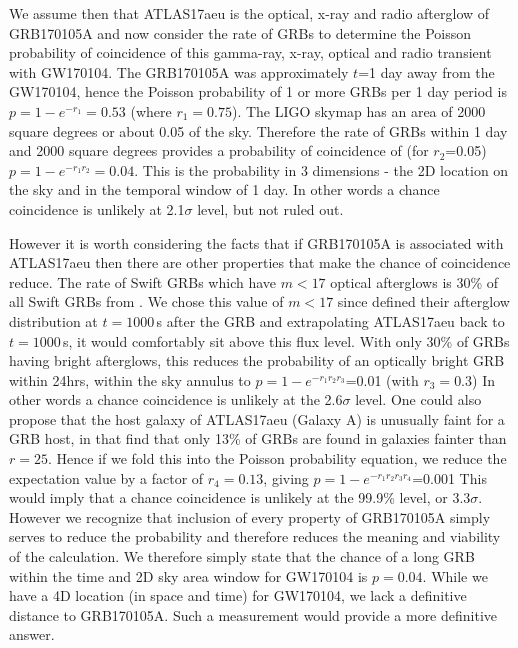 \documentclass[twocolumn]{aastex61}
\begin{document}
We assume then that  ATLAS17aeu is the optical, x-ray and radio afterglow of GRB170105A and  now consider the rate of GRBs to determine the Poisson probability 
of coincidence of this gamma-ray, x-ray, optical and radio transient 
 with GW170104. 
The GRB170105A was approximately 
$t$=1 day away from the GW170104, hence the Poisson probability of 1 or more GRBs per 1 day period is 
$p=1- e^{-r_1}=0.53$ (where $r_1=0.75$).
The LIGO skymap has an area of 2000 square degrees  
\citep[90\% enclosed probability, from the LALInference map;][]{2015PhRvD..91d2003V} or about 0.05 of the sky. 
Therefore the rate of GRBs within 1 day and 2000 square degrees provides a 
probability of coincidence of (for $r_2$=0.05) 
$p=1- e^{-r_1 r_2}=0.04$.  This is the probability in 3 dimensions - the 2D location on the sky and in the temporal 
window of 1 day.  In other words 
a chance coincidence is unlikely at 2.1$\sigma$ level, but not ruled out. 

However it is worth considering the facts that
if GRB170105A is associated with ATLAS17aeu then 
there are other properties that make the chance of 
coincidence  reduce.  The rate of Swift GRBs which have $m<17$ optical afterglows is 30\% of all Swift GRBs
from \cite{2009ApJ...693.1484C}. We chose this value of  $m<17$ since \cite{2009ApJ...693.1484C} 
defined their afterglow distribution at $t=1000$\,s after the GRB and extrapolating ATLAS17aeu back to 
$t=1000$\,s, it would comfortably sit above this flux level. With only 30\% of GRBs having bright 
afterglows, this reduces the probability of an optically bright GRB within 24hrs, within
the sky annulus to 
$p=1- e^{-r_1 r_2 r_3}$=0.01 (with $r_3=0.3$)
In other words a chance coincidence is unlikely at the 2.6$\sigma$  level.  
One could also propose that the host galaxy of ATLAS17aeu (Galaxy A) is
unusually faint for a GRB host, in that \cite{2009ApJ...691..182S} find 
that only 13\% of GRBs are found in galaxies fainter than $r=25$. Hence
if we fold this into the Poisson probability equation, we reduce the 
expectation value by a factor of $r_4=0.13$, giving 
$p=1- e^{-r_1 r_2 r_3 r_4}$=0.001
This would imply that 
a chance coincidence is unlikely at the 99.9\% level, or 3.3$\sigma$.  However we recognize that inclusion of every
property of GRB170105A simply serves to reduce the probability and therefore reduces the meaning and viability of the calculation. We therefore simply state that the chance of 
a long GRB within the time and 2D sky area window 
for GW170104 is 
$p=0.04$. While we have a 4D location (in space and time)
for GW170104, we lack a definitive distance to GRB170105A.
Such a measurement would provide a more definitive 
answer. 
\end{document}
